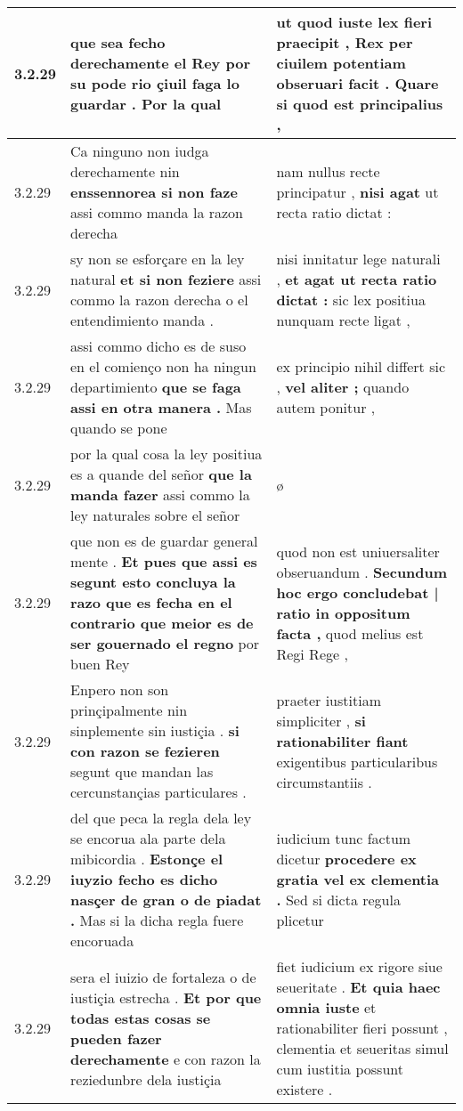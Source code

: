 \begin{tabular}{|p{1cm}|p{6.5cm}|p{6.5cm}|}
3.2.29 & que sea fecho derechamente el Rey \textbf{ por su pode rio çiuil faga lo guardar . } Por la qual & ut quod iuste lex fieri praecipit , \textbf{ Rex per ciuilem potentiam obseruari facit . } Quare si quod est principalius , \\\hline
3.2.29 & Ca ninguno non iudga derechamente nin \textbf{ enssennorea si non faze } assi commo manda la razon derecha & nam nullus recte principatur , \textbf{ nisi agat } ut recta ratio dictat : \\\hline
3.2.29 & sy non se esforçare en la ley natural \textbf{ et si non feziere } assi commo la razon derecha o el entendimiento manda . & nisi innitatur lege naturali , \textbf{ et agat ut recta ratio dictat : } sic lex positiua nunquam recte ligat , \\\hline
3.2.29 & assi commo dicho es de suso en el comienço non ha ningun departimiento \textbf{ que se faga assi en otra manera . } Mas quando se pone & ex principio nihil differt sic , \textbf{ vel aliter ; } quando autem ponitur , \\\hline
3.2.29 & por la qual cosa la ley positiua es a quande del señor \textbf{ que la manda fazer } assi commo la ley naturales sobre el señor & ø \\\hline
3.2.29 & que non es de guardar general mente . \textbf{ Et pues que assi es segunt esto concluya la razo que es fecha en el contrario que meior es de ser gouernado el regno } por buen Rey & quod non est uniuersaliter obseruandum . \textbf{ Secundum hoc ergo concludebat | ratio in oppositum facta , } quod melius est Regi Rege , \\\hline
3.2.29 & Enpero non son prinçipalmente nin sinplemente sin iustiçia . \textbf{ si con razon se fezieren } segunt que mandan las cercunstançias particulares . & praeter iustitiam simpliciter , \textbf{ si rationabiliter fiant } exigentibus particularibus circumstantiis . \\\hline
3.2.29 & del que peca la regla dela ley se encorua ala parte dela mibicordia . \textbf{ Estonçe el iuyzio fecho es dicho nasçer de gran o de piadat . } Mas si la dicha regla fuere encoruada & iudicium tunc factum dicetur \textbf{ procedere ex gratia vel ex clementia . } Sed si dicta regula plicetur \\\hline
3.2.29 & sera el iuizio de fortaleza o de iustiçia estrecha . \textbf{ Et por que todas estas cosas se pueden fazer derechamente } e con razon la reziedunbre dela iustiçia & fiet iudicium ex rigore siue seueritate . \textbf{ Et quia haec omnia iuste } et rationabiliter fieri possunt , clementia et seueritas simul cum iustitia possunt existere . \\\hline

\end{tabular}
